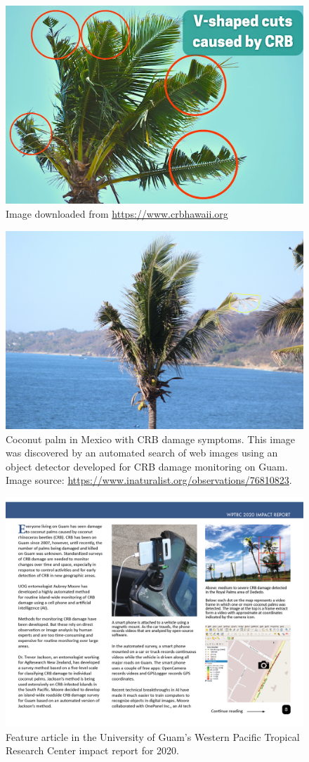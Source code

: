\documentclass[11pt,english,letterpaper]{scrartcl}
\begin{document}
\begin{figure}[H]
	\centering
	\includegraphics[width=0.7\linewidth]{images/vcuts}
	\caption{Image downloaded from \url{https://www.crbhawaii.org}}
	\label{fig:vcuts}
\end{figure}

\begin{figure}[H]
	\centering
	\includegraphics[width=0.7\linewidth]{images/crb-mexico}
	\caption{Coconut palm in Mexico with CRB damage symptoms. This image was discovered by an automated search of web images using an object detector developed for CRB damage monitoring on Guam. Image source: \url{https://www.inaturalist.org/observations/76810823}.}	
	\label{fig:crb-mexico}
\end{figure}

\begin{figure}[H]
	\centering
	\includegraphics[width=\linewidth]{images/impact-report08.png}
	\caption{Feature article in the University of Guam's Western Pacific Tropical Research Center impact report for 2020.}
	\label{fig:roadside1-2}
\end{figure}
\end{document}
